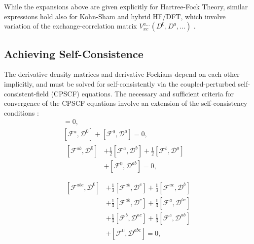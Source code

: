 \documentclass[prl,aps,letterpaper,twocolumn,showpacs,twocolumngrid,superbib]{revtex4}
\def\F{\mathcal{F}}
\def\D{\mathcal{D}}
\begin{document}
While the expansions above are given explicitly for Hartree-Fock Theory, similar expressions 
hold also for Kohn-Sham and hybrid HF/DFT,  which involve variation of the  exchange-correlation 
matrix $V_{xc}^{a\ldots}(D^0,D^a,\ldots)$ \cite{Lee_1994,PSalek02}.

\subsection{Achieving Self-Consistence}\label{SelfConsistency}

The derivative density matrices and derivative Fockians depend on 
each other implicitly, and must be solved for self-consistently
via the coupled-perturbed self-consistent-field (CPSCF) equations.
The necessary and sufficient criteria for convergence of the 
CPSCF equations involve an extension of the self-consistency conditions \cite{Furche_2001}:
\begin{gather}
    [\F^{0} ,\D^{0}]=0,\label{eq:commutators1}\\
    [\F^{a} ,\D^{0}]+[\F^{0},\D^{a}]=0,\label{eq:commutators2}\\
  \begin{split}
    [\F^{ab},\D^{0}]&+\frac{1}{2}[\F^{a},\D^{b}]+\frac{1}{2}[\F^{b},\D^{a}] \\
    &+[\F^{0},\D^{ab}]=0,\label{eq:commutators3}\\
  \end{split}\\
  \begin{split}
    [\F^{abc},\D^{0}]&+\frac{1}{3}[\F^{ab},\D^{c}]+\frac{1}{3}[\F^{ac},\D^{b}]\\
    &+\frac{1}{3}[\F^{ab},\D^{c}]+\frac{1}{3}[\F^{a},\D^{bc}]\\
    &+\frac{1}{3}[\F^{b},\D^{ac}]+\frac{1}{3}[\F^{c},\D^{ab}]\\
    &+[\F^{0},\D^{abc}]=0,\label{eq:commutators4}\\
  \end{split}
\end{gather}
\end{document}
